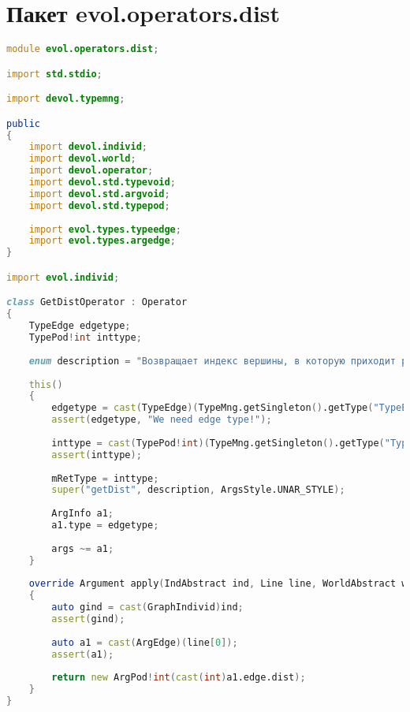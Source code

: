 \documentclass[russian,utf8,emptystyle]{eskdtext}
\begin{document}
\section{Пакет evol.operators.dist}
\begin{lstlisting}[language=D]
module evol.operators.dist;

import std.stdio;

import devol.typemng;

public
{
    import devol.individ;
    import devol.world;
    import devol.operator;
    import devol.std.typevoid;
    import devol.std.argvoid;
    import devol.std.typepod;
    
    import evol.types.typeedge;
    import evol.types.argedge;
}

import evol.individ;

class GetDistOperator : Operator
{
    TypeEdge edgetype;
    TypePod!int inttype;
    
    enum description = "Возвращает индекс вершины, в которую приходит ребро графа.";
    
    this()
    {
        edgetype = cast(TypeEdge)(TypeMng.getSingleton().getType("TypeEdge"));
        assert(edgetype, "We need edge type!");
    
        inttype = cast(TypePod!int)(TypeMng.getSingleton().getType("Typeint"));
        assert(inttype);
        
        mRetType = inttype;
        super("getDist", description, ArgsStyle.UNAR_STYLE);
        
        ArgInfo a1;
        a1.type = edgetype;
        
        args ~= a1;
    }
    
    override Argument apply(IndAbstract ind, Line line, WorldAbstract world)
    {
        auto gind = cast(GraphIndivid)ind;
        assert(gind);
        
        auto a1 = cast(ArgEdge)(line[0]);
        assert(a1);
        
        return new ArgPod!int(cast(int)a1.edge.dist);
    }   
}
\end{lstlisting}
\end{document}
